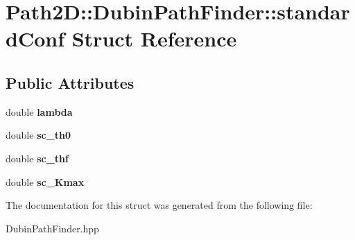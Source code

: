 \hypertarget{struct_path2_d_1_1_dubin_path_finder_1_1standard_conf}{}\section{Path2D\+:\+:Dubin\+Path\+Finder\+:\+:standard\+Conf Struct Reference}
\label{struct_path2_d_1_1_dubin_path_finder_1_1standard_conf}
\subsection*{Public Attributes}
\begin{DoxyCompactItemize}
\item 
\mbox{\label{struct_path2_d_1_1_dubin_path_finder_1_1standard_conf_a6383aeef4501ac4b4c31006f84cb801b}} 
double {\bfseries lambda}
\item 
\mbox{\label{struct_path2_d_1_1_dubin_path_finder_1_1standard_conf_a78e4fe8bea873cb8deb9b54435e6d880}} 
double {\bfseries sc\+\_\+th0}
\item 
\mbox{\label{struct_path2_d_1_1_dubin_path_finder_1_1standard_conf_a4dc3e36105b402b5835644443b86e9de}} 
double {\bfseries sc\+\_\+thf}
\item 
\mbox{\label{struct_path2_d_1_1_dubin_path_finder_1_1standard_conf_a3895d6f2dd23fefcc3bad68f2e65a05f}} 
double {\bfseries sc\+\_\+\+Kmax}
\end{DoxyCompactItemize}


The documentation for this struct was generated from the following file\+:\begin{DoxyCompactItemize}
\item 
Dubin\+Path\+Finder.\+hpp\end{DoxyCompactItemize}

